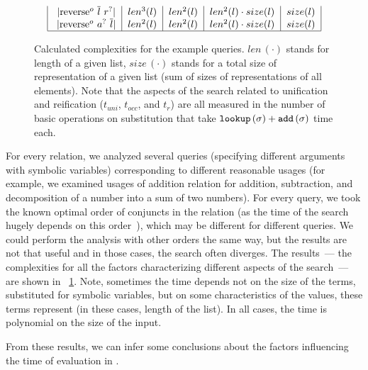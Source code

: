 \begin{figure}[t]
\[\begin{tabular}{|c|c|c|c|c|}
           \lstinline|reverse$^o$ $\overline{l}$ $r^?$| & $len^3(l)$ & $len^2(l)$ & $len^2(l) \cdot size(l)$ & $size(l)$  \\
           \lstinline|reverse$^o$ $a^?$ $\overline{l}$| & $len^2(l)$ & $len^2(l)$ & $len^2(l) \cdot size(l)$ & $size(l)$  \\
           \hline
      \end{tabular} \]
      \caption{Calculated complexities for the example queries. $len\,(\cdot)$ stands for length of a given list, $size\,(\cdot)$ stands for a total size of representation of a given
        list (sum of sizes of representations of all elements). Note that the aspects of the search related to unification and reification ($t_{uni}$, $t_{occ}$, and $t_r$) are all measured
        in the number of basic operations on substitution that take $\texttt{lookup}\,(\sigma) + \texttt{add}\,(\sigma)$ time each.}
  \label{fig:examples_all_complexities}
\end{figure}

For every relation, we analyzed several queries (specifying different arguments with symbolic variables) corresponding to different reasonable usages (for example, we examined usages
of addition relation for addition, subtraction, and decomposition of a number into a sum of two numbers). For every query, we took the known optimal order of conjuncts in the relation
(as the time of the search hugely depends on this order~\cite{WillThesis}), which may be different for different queries. We could perform the analysis with other orders the same way,
but the results are not that useful and in those cases, the search often diverges. The results~--- the complexities for all the factors characterizing different aspects of the search~---
are shown in \figureword~\ref{fig:examples_all_complexities}. Note, sometimes the time depends not on the size of the terms, substituted for symbolic variables, but on some
characteristics of the values, these terms represent (in these cases, length of the list). In all cases, the time is polynomial on the size of the input.

From these results, we can infer some conclusions about the factors influencing the time of evaluation in \mK.

